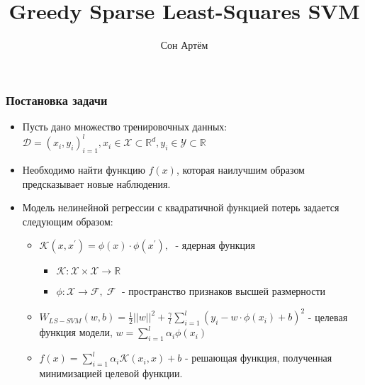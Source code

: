\documentclass{beamer}
\title{Greedy Sparse Least-Squares SVM}
\author{Сон Артём}
\begin{document}
\maketitle

\begin{frame}
	\frametitle{Постановка задачи}
	\begin{itemize}
		\item Пусть дано множество тренировочных данных:
		      $ \mathcal{D} = {(x_i, y_i)}_{i = 1}^{l}, x_i \in \mathcal{X} \subset
			      \mathbb{R}^d, y_i \in \mathcal{Y} \subset \mathbb{R}$
		\item Необходимо найти функцию $f(x)$, которая наилучшим образом
		      предсказывает новые наблюдения.
		\item Модель нелинейной регрессии с квадратичной функцией
		      потерь задается следующим образом:
		      \begin{itemize}
			      \item $\mathcal{K}(x, x^{\prime}) = \phi(x) \cdot \phi(x^\prime), \;$
			            - ядерная функция
			            \begin{itemize}
				            \item $\mathcal{K} : \mathcal{X} \times \mathcal{X}
					                  \rightarrow \mathbb{R}$
				            \item $\phi: \mathcal{X} \rightarrow \mathcal{F}, \;
					                  \mathcal{F} \;$  - пространство признаков высшей
				                  размерности
			            \end{itemize}
			      \item $W_{LS-SVM}(w, b) = \frac{1}{2} ||w||^2 + \frac{\gamma}{l}
				            \sum_{i = 1}^{l}(y_i - w \cdot \phi(x_i) + b)^2$
			            - целевая функция модели,
			            $w = \sum_{i=1}^{l} \alpha_i \phi(x_i)$
			      \item $f(x) = \sum_{i = 1}^{l} \alpha_i \mathcal{K}(x_i, x) + b$ -
			            решающая функция, полученная минимизацией целевой функции.
		      \end{itemize}
	\end{itemize}

\end{frame}
\end{document}
